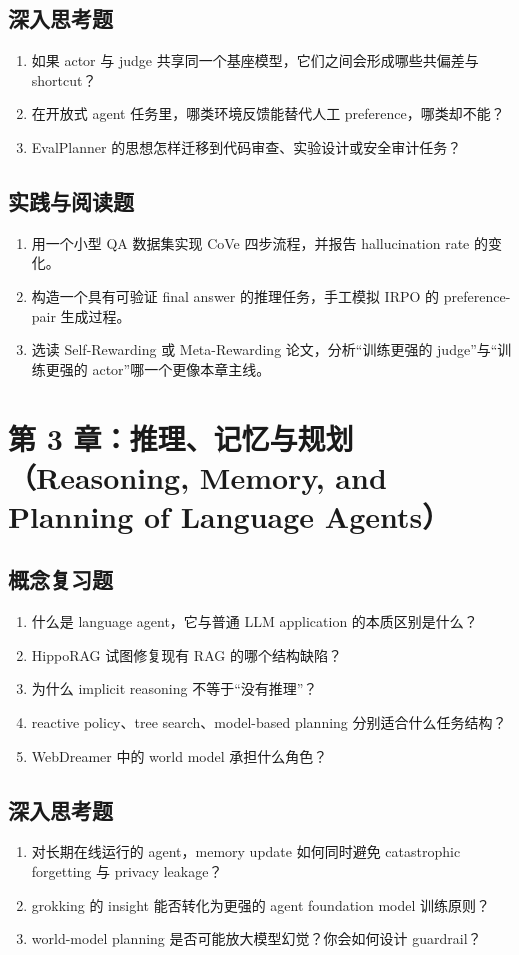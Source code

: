 \subsection*{深入思考题}
\begin{enumerate}
\item 如果 actor 与 judge 共享同一个基座模型，它们之间会形成哪些共偏差与 shortcut？
\item 在开放式 agent 任务里，哪类环境反馈能替代人工 preference，哪类却不能？
\item EvalPlanner 的思想怎样迁移到代码审查、实验设计或安全审计任务？
\end{enumerate}

\subsection*{实践与阅读题}
\begin{enumerate}
\item 用一个小型 QA 数据集实现 CoVe 四步流程，并报告 hallucination rate 的变化。
\item 构造一个具有可验证 final answer 的推理任务，手工模拟 IRPO 的 preference-pair 生成过程。
\item 选读 Self-Rewarding 或 Meta-Rewarding 论文，分析“训练更强的 judge”与“训练更强的 actor”哪一个更像本章主线。
\end{enumerate}

\section{第 3 章：推理、记忆与规划（Reasoning, Memory, and Planning of Language Agents）}

\subsection*{概念复习题}
\begin{enumerate}
\item 什么是 language agent，它与普通 LLM application 的本质区别是什么？
\item HippoRAG 试图修复现有 RAG 的哪个结构缺陷？
\item 为什么 implicit reasoning 不等于“没有推理”？
\item reactive policy、tree search、model-based planning 分别适合什么任务结构？
\item WebDreamer 中的 world model 承担什么角色？
\end{enumerate}

\subsection*{深入思考题}
\begin{enumerate}
\item 对长期在线运行的 agent，memory update 如何同时避免 catastrophic forgetting 与 privacy leakage？
\item grokking 的 insight 能否转化为更强的 agent foundation model 训练原则？
\item world-model planning 是否可能放大模型幻觉？你会如何设计 guardrail？
\end{enumerate}

